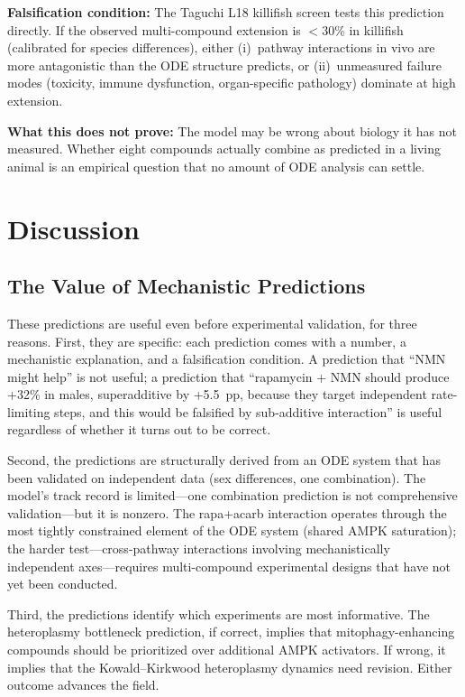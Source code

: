 \documentclass[11pt]{article}
\begin{document}
\textbf{Falsification condition:} The Taguchi L18 killifish screen \citep{Biggs2025taguchi} tests this prediction directly. If the observed multi-compound extension is $<$30\% in killifish (calibrated for species differences), either (i)~pathway interactions in vivo are more antagonistic than the ODE structure predicts, or (ii)~unmeasured failure modes (toxicity, immune dysfunction, organ-specific pathology) dominate at high extension.

\textbf{What this does not prove:} The model may be wrong about biology it has not measured. Whether eight compounds actually combine as predicted in a living animal is an empirical question that no amount of ODE analysis can settle.

\section{Discussion}

\subsection{The Value of Mechanistic Predictions}

These predictions are useful even before experimental validation, for three reasons. First, they are specific: each prediction comes with a number, a mechanistic explanation, and a falsification condition. A prediction that ``NMN might help'' is not useful; a prediction that ``rapamycin + NMN should produce +32\% in males, superadditive by +5.5~pp, because they target independent rate-limiting steps, and this would be falsified by sub-additive interaction'' is useful regardless of whether it turns out to be correct.

Second, the predictions are structurally derived from an ODE system that has been validated on independent data (sex differences, one combination). The model's track record is limited---one combination prediction is not comprehensive validation---but it is nonzero. The rapa+acarb interaction operates through the most tightly constrained element of the ODE system (shared AMPK saturation); the harder test---cross-pathway interactions involving mechanistically independent axes---requires multi-compound experimental designs that have not yet been conducted.

Third, the predictions identify which experiments are most informative. The heteroplasmy bottleneck prediction, if correct, implies that mitophagy-enhancing compounds should be prioritized over additional AMPK activators. If wrong, it implies that the Kowald--Kirkwood heteroplasmy dynamics need revision. Either outcome advances the field.
\end{document}
